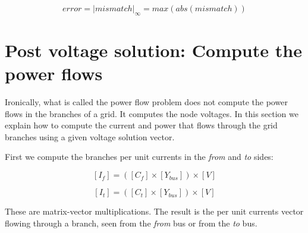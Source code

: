 \documentclass[nols,a4paper,twoside,symmetric,notoc,fleqn]{tufte-book}
\begin{document}
\begin{equation}
error = |mismatch|_\infty = max(abs(mismatch))
\end{equation}


\newpage
\section{Post voltage solution: Compute the power flows} \label{post_voltage_solution}

Ironically, what is called the power flow problem does not compute the power flows in the branches of a grid. It computes the node voltages. In this section we explain how to compute the current and power that flows through the grid branches using a given voltage solution vector.




First we compute the branches per unit currents in the \textit{from} and \textit{to} sides:

\begin{equation}
{[I_f] = ([C_f] \times [Y_{bus}]) \times [V]}
\end{equation}

\begin{equation}
{[I_t] = ([C_t] \times [Y_{bus}]) \times [V]}
\end{equation}


These are matrix-vector multiplications. The result is the per unit currents vector flowing through a branch, seen from the \textit{from} bus or from the \textit{to} bus.
\end{document}
